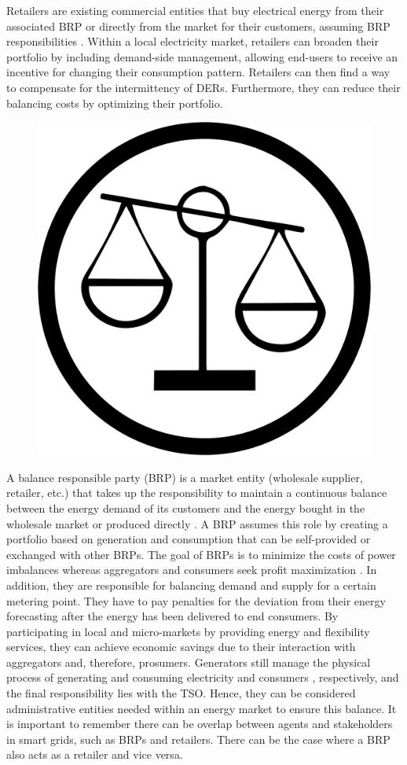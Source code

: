 Retailers are existing commercial entities that buy electrical energy from their associated BRP or directly from the market for their customers, assuming BRP responsibilities \cite{VILLAR2018Flexibility}. Within a local electricity market, retailers can broaden their portfolio by including demand-side management, allowing end-users to receive an incentive for changing their consumption pattern. Retailers can then find a way to compensate for the intermittency of DERs. Furthermore, they can reduce their balancing costs by optimizing their portfolio. \\

\begin{figure}
	\centering
	\includegraphics[width=0.1\columnwidth ]{ChapterIntro/Figures/BRP.jpg}
	\label{BRP}  
\end{figure}

A balance responsible party (BRP) is a market entity (wholesale supplier, retailer, etc.) that takes up the responsibility to maintain a continuous balance between the energy demand of its customers and the energy bought in the wholesale market or produced directly \cite{mandatova2014flexibility}. A BRP assumes this role by creating a portfolio based on generation and consumption that can be self-provided or exchanged with other BRPs. The goal of BRPs is to minimize the costs of power imbalances whereas aggregators and consumers seek profit maximization \cite{torbaghan2016local}. In addition, they are responsible for balancing demand and supply for a certain metering point. They have to pay penalties for the deviation from their energy forecasting after the energy has been delivered to end consumers. By participating in local and micro-markets by providing energy and flexibility services, they can achieve economic savings due to their interaction with aggregators and, therefore, prosumers. Generators still manage the physical process of generating and consuming electricity and consumers \cite{KULEnergyInstitute2015}, respectively, and the final responsibility lies with the TSO. Hence, they can be considered administrative entities needed within an energy market to ensure this balance. It is important to remember there can be overlap between agents and stakeholders in smart grids, such as BRPs and retailers. There can be the case where a BRP also acts as a retailer and vice versa. \\



